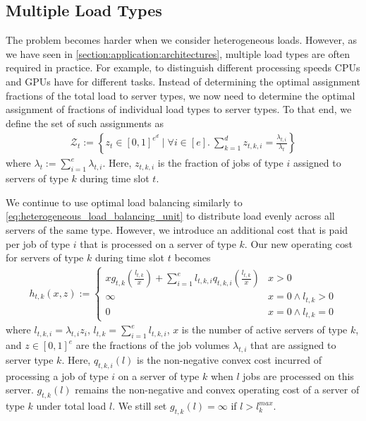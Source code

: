 \subsection{Multiple Load Types}\label{section:application:dispatching:multiple_load_types}

The problem becomes harder when we consider heterogeneous loads. However, as we have seen in \autoref{section:application:architectures}, multiple load types are often required in practice. For example, to distinguish different processing speeds CPUs and GPUs have for different tasks. Instead of determining the optimal assignment fractions of the total load to server types, we now need to determine the optimal assignment of fractions of individual load types to server types. To that end, we define the set of such assignments as \begin{align*}
    \mathcal{Z}_t := \left\{z_t \in [0,1]^{e^d} \mid \forall i \in [e].\ \sum_{k=1}^d z_{t,k,i} = \frac{\lambda_{t,i}}{\lambda_t}\right\}
\end{align*} where $\lambda_t := \sum_{i=1}^e \lambda_{t,i}$. Here, $z_{t,k,i}$ is the fraction of jobs of type $i$ assigned to servers of type $k$ during time slot $t$.

We continue to use optimal load balancing similarly to \autoref{eq:heterogeneous_load_balancing_unit} to distribute load evenly across all servers of the same type. However, we introduce an additional cost that is paid per job of type $i$ that is processed on a server of type $k$. Our new operating cost for servers of type $k$ during time slot $t$ becomes \begin{align}\label{eq:multiple_load_types_load_balancing_unit}
    h_{t,k}(x,z) := \begin{cases}
        x g_{t,k}\left(\frac{l_{t,k}}{x}\right) + \sum_{i=1}^e l_{t,k,i} q_{t,k,i}\left(\frac{l_{t,k}}{x}\right) & x > 0 \\
        \infty                                                                                                   & x = 0 \land l_{t,k} > 0 \\
        0                                                                                                        & x = 0 \land l_{t,k} = 0
    \end{cases}
\end{align} where $l_{t,k,i} = \lambda_{t,i} z_i$, $l_{t,k} = \sum_{i=1}^e l_{t,k,i}$, $x$ is the number of active servers of type $k$, and $z \in [0,1]^e$ are the fractions of the job volumes $\lambda_{t,i}$ that are assigned to server type $k$. Here, $q_{t,k,i}(l)$ is the non-negative convex cost incurred of processing a job of type $i$ on a server of type $k$ when $l$ jobs are processed on this server. $g_{t,k}(l)$ remains the non-negative and convex operating cost of a server of type $k$ under total load $l$. We still set $g_{t,k}(l) = \infty$ if $l > l_k^{max}$.

